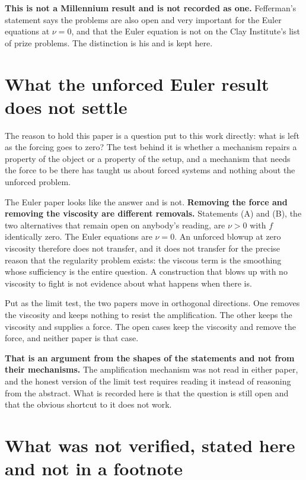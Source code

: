 \textbf{This is not a Millennium result and is not recorded as one.} Fefferman's statement says the
problems are also open and very important for the Euler equations at $\nu = 0$, and that the Euler
equation is not on the Clay Institute's list of prize problems. The distinction is his and is kept
here.

\section{What the unforced Euler result does not settle}

The reason to hold this paper is a question put to this work directly: what is left as the forcing
goes to zero? The test behind it is whether a mechanism repairs a property of the object or a
property of the setup, and a mechanism that needs the force to be there has taught us about forced
systems and nothing about the unforced problem.

The Euler paper looks like the answer and is not. \textbf{Removing the force and removing the
viscosity are different removals.} Statements (A) and (B), the two alternatives that remain open on
anybody's reading, are $\nu > 0$ with $f$ identically zero. The Euler equations are $\nu = 0$. An
unforced blowup at zero viscosity therefore does not transfer, and it does not transfer for the precise
reason that the regularity problem exists: the viscous term is the smoothing whose sufficiency is
the entire question. A construction that blows up with no viscosity to fight is not evidence about
what happens when there is.

Put as the limit test, the two papers move in orthogonal directions. One removes the viscosity and
keeps nothing to resist the amplification. The other keeps the viscosity and supplies a force. The
open cases keep the viscosity and remove the force, and neither paper is that case.

\textbf{That is an argument from the shapes of the statements and not from their mechanisms.} The
amplification mechanism was not read in either paper, and the honest version of the limit test
requires reading it instead of reasoning from the abstract. What is recorded here is that the
question is still open and that the obvious shortcut to it does not work.

\section{What was not verified, stated here and not in a footnote}

